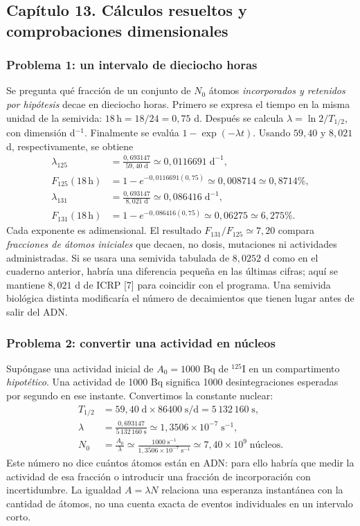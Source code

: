 \clearpage
\subsection{Capítulo 13. Cálculos resueltos y comprobaciones dimensionales}
\label{ampliacion-ejercicios}

\subsubsection{Problema 1: un intervalo de dieciocho horas}
Se pregunta qué fracción de un conjunto de $N_0$ átomos \emph{incorporados y
retenidos por hipótesis} decae en dieciocho horas. Primero se expresa el
tiempo en la misma unidad de la semivida: $18\,\mathrm h=18/24=0,75$ d.
Después se calcula $\lambda=\ln2/T_{1/2}$, con dimensión d$^{-1}$.
Finalmente se evalúa $1-\exp(-\lambda t)$. Usando $59,40$ y $8,021$ d,
respectivamente, se obtiene
\begin{align}
\lambda_{125}&=\frac{0,693147}{59,40\;\mathrm d}
  \simeq0,0116691\;\mathrm d^{-1},\\
F_{125}(18\,\mathrm h)&=1-e^{-0,0116691(0,75)}
  \simeq0,008714\simeq0,8714\%,\\
\lambda_{131}&=\frac{0,693147}{8,021\;\mathrm d}
  \simeq0,086416\;\mathrm d^{-1},\\
F_{131}(18\,\mathrm h)&=1-e^{-0,086416(0,75)}
  \simeq0,06275\simeq6,275\%.
\end{align}
Cada exponente es adimensional. El resultado $F_{131}/F_{125}\simeq7,20$
compara \emph{fracciones de átomos iniciales} que decaen, no dosis,
mutaciones ni actividades administradas. Si se usara una semivida tabulada
de $8,0252$ d como en el cuaderno anterior, habría una diferencia pequeña
en las últimas cifras; aquí se mantiene $8,021$ d de ICRP [7] para coincidir
con el programa. Una semivida biológica distinta modificaría el número de
decaimientos que tienen lugar antes de salir del ADN.

\subsubsection{Problema 2: convertir una actividad en núcleos}
Supóngase una actividad inicial de $A_0=1000$ Bq de $^{125}$I en un
compartimento \emph{hipotético}. Una actividad de 1000 Bq significa
1000 desintegraciones esperadas por segundo en ese instante. Convertimos
la constante nuclear:
\begin{align}
T_{1/2}&=59,40\;\mathrm d\times86400\;\mathrm{s/d}
  =5\,132\,160\;\mathrm s,\\
\lambda&=\frac{0,693147}{5\,132\,160\;\mathrm s}
  \simeq1,3506\times10^{-7}\;\mathrm{s^{-1}},\\
N_0&=\frac{A_0}{\lambda}
  \simeq\frac{1000\;\mathrm{s^{-1}}}{1,3506\times10^{-7}\;\mathrm{s^{-1}}}
  \simeq7,40\times10^9\;\text{núcleos}.
\end{align}
Este número no dice cuántos átomos están en ADN: para ello habría que medir
la actividad de esa fracción o introducir una fracción de incorporación
con incertidumbre. La igualdad $A=\lambda N$ relaciona una esperanza
instantánea con la cantidad de átomos, no una cuenta exacta de eventos
individuales en un intervalo corto.

